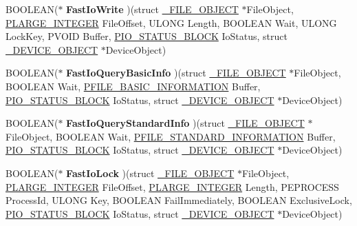 \begin{DoxyCompactItemize}
\item 
\hypertarget{struct__FAST__IO__DISPATCH_ab8367fd3f7b712dd9d33151191be9858}{}B\+O\+O\+L\+E\+A\+N($\ast$ {\bfseries Fast\+Io\+Write} )(struct \hyperlink{struct__FILE__OBJECT}{\+\_\+\+F\+I\+L\+E\+\_\+\+O\+B\+J\+E\+C\+T} $\ast$File\+Object, \hyperlink{union__LARGE__INTEGER}{P\+L\+A\+R\+G\+E\+\_\+\+I\+N\+T\+E\+G\+E\+R} File\+Offset, U\+L\+O\+N\+G Length, B\+O\+O\+L\+E\+A\+N Wait, U\+L\+O\+N\+G Lock\+Key, P\+V\+O\+I\+D Buffer, \hyperlink{struct__IO__STATUS__BLOCK}{P\+I\+O\+\_\+\+S\+T\+A\+T\+U\+S\+\_\+\+B\+L\+O\+C\+K} Io\+Status, struct \hyperlink{struct__DEVICE__OBJECT}{\+\_\+\+D\+E\+V\+I\+C\+E\+\_\+\+O\+B\+J\+E\+C\+T} $\ast$Device\+Object)\label{struct__FAST__IO__DISPATCH_ab8367fd3f7b712dd9d33151191be9858}

\item 
\hypertarget{struct__FAST__IO__DISPATCH_a3068a912f4ba5c2f4a49e49fc1010c28}{}B\+O\+O\+L\+E\+A\+N($\ast$ {\bfseries Fast\+Io\+Query\+Basic\+Info} )(struct \hyperlink{struct__FILE__OBJECT}{\+\_\+\+F\+I\+L\+E\+\_\+\+O\+B\+J\+E\+C\+T} $\ast$File\+Object, B\+O\+O\+L\+E\+A\+N Wait, \hyperlink{struct__FILE__BASIC__INFORMATION}{P\+F\+I\+L\+E\+\_\+\+B\+A\+S\+I\+C\+\_\+\+I\+N\+F\+O\+R\+M\+A\+T\+I\+O\+N} Buffer, \hyperlink{struct__IO__STATUS__BLOCK}{P\+I\+O\+\_\+\+S\+T\+A\+T\+U\+S\+\_\+\+B\+L\+O\+C\+K} Io\+Status, struct \hyperlink{struct__DEVICE__OBJECT}{\+\_\+\+D\+E\+V\+I\+C\+E\+\_\+\+O\+B\+J\+E\+C\+T} $\ast$Device\+Object)\label{struct__FAST__IO__DISPATCH_a3068a912f4ba5c2f4a49e49fc1010c28}

\item 
\hypertarget{struct__FAST__IO__DISPATCH_a99ba17c12841ca20ce2d7ba5d57753a1}{}B\+O\+O\+L\+E\+A\+N($\ast$ {\bfseries Fast\+Io\+Query\+Standard\+Info} )(struct \hyperlink{struct__FILE__OBJECT}{\+\_\+\+F\+I\+L\+E\+\_\+\+O\+B\+J\+E\+C\+T} $\ast$File\+Object, B\+O\+O\+L\+E\+A\+N Wait, \hyperlink{struct__FILE__STANDARD__INFORMATION}{P\+F\+I\+L\+E\+\_\+\+S\+T\+A\+N\+D\+A\+R\+D\+\_\+\+I\+N\+F\+O\+R\+M\+A\+T\+I\+O\+N} Buffer, \hyperlink{struct__IO__STATUS__BLOCK}{P\+I\+O\+\_\+\+S\+T\+A\+T\+U\+S\+\_\+\+B\+L\+O\+C\+K} Io\+Status, struct \hyperlink{struct__DEVICE__OBJECT}{\+\_\+\+D\+E\+V\+I\+C\+E\+\_\+\+O\+B\+J\+E\+C\+T} $\ast$Device\+Object)\label{struct__FAST__IO__DISPATCH_a99ba17c12841ca20ce2d7ba5d57753a1}

\item 
\hypertarget{struct__FAST__IO__DISPATCH_a9fa092bb65a60a1421ac76f423c0374e}{}B\+O\+O\+L\+E\+A\+N($\ast$ {\bfseries Fast\+Io\+Lock} )(struct \hyperlink{struct__FILE__OBJECT}{\+\_\+\+F\+I\+L\+E\+\_\+\+O\+B\+J\+E\+C\+T} $\ast$File\+Object, \hyperlink{union__LARGE__INTEGER}{P\+L\+A\+R\+G\+E\+\_\+\+I\+N\+T\+E\+G\+E\+R} File\+Offset, \hyperlink{union__LARGE__INTEGER}{P\+L\+A\+R\+G\+E\+\_\+\+I\+N\+T\+E\+G\+E\+R} Length, P\+E\+P\+R\+O\+C\+E\+S\+S Process\+Id, U\+L\+O\+N\+G Key, B\+O\+O\+L\+E\+A\+N Fail\+Immediately, B\+O\+O\+L\+E\+A\+N Exclusive\+Lock, \hyperlink{struct__IO__STATUS__BLOCK}{P\+I\+O\+\_\+\+S\+T\+A\+T\+U\+S\+\_\+\+B\+L\+O\+C\+K} Io\+Status, struct \hyperlink{struct__DEVICE__OBJECT}{\+\_\+\+D\+E\+V\+I\+C\+E\+\_\+\+O\+B\+J\+E\+C\+T} $\ast$Device\+Object)\label{struct__FAST__IO__DISPATCH_a9fa092bb65a60a1421ac76f423c0374e}


\end{DoxyCompactItemize}
